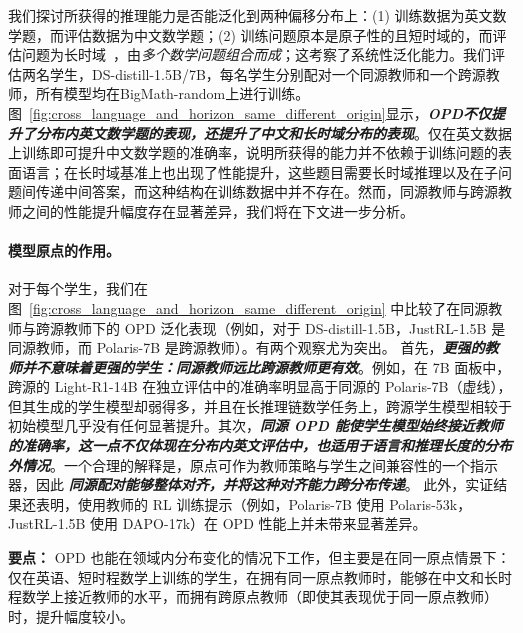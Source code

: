 我们探讨所获得的推理能力是否能泛化到两种偏移分布上：(1) 训练数据为英文数学题，而评估数据为中文数学题；(2) 训练问题原本是原子性的且短时域的，而评估问题为长时域~\citep{dziri2023faith, shojaee2025the,lu2025r}，由\emph{多个数学问题组合而成}；这考察了系统性泛化能力。我们评估两名学生，DS-distill-1.5B/7B，每名学生分别配对一个同源教师和一个跨源教师，所有模型均在BigMath-random上进行训练。图~\ref{fig:cross_language_and_horizon_same_different_origin}显示，\emph{\textbf{OPD不仅提升了分布内英文数学题的表现，还提升了中文和长时域分布的表现}}。仅在英文数据上训练即可提升中文数学题的准确率，说明所获得的能力并不依赖于训练问题的表面语言；在长时域基准上也出现了性能提升，这些题目需要长时域推理以及在子问题间传递中间答案，而这种结构在训练数据中并不存在。然而，同源教师与跨源教师之间的性能提升幅度存在显著差异，我们将在下文进一步分析。

\paragraph{模型原点的作用。}
\label{subsec:origin_indomain}
对于每个学生，我们在图~\ref{fig:cross_language_and_horizon_same_different_origin} 中比较了在同源教师与跨源教师下的 OPD 泛化表现（例如，对于 DS-distill-1.5B，JustRL-1.5B 是同源教师，而 Polaris-7B 是跨源教师）。有两个观察尤为突出。  
首先，\emph{\textbf{更强的教师并不意味着更强的学生：同源教师远比跨源教师更有效}}。例如，在 7B 面板中，跨源的 Light-R1-14B 在独立评估中的准确率明显高于同源的 Polaris-7B（虚线），但其生成的学生模型却弱得多，并且在长推理链数学任务上，跨源学生模型相较于初始模型几乎没有任何显著提升。其次，\emph{\textbf{同源 OPD 能使学生模型始终接近教师的准确率，这一点不仅体现在分布内英文评估中，也适用于语言和推理长度的分布外情况}}。一个合理的解释是，原点可作为教师策略与学生之间兼容性的一个指示器，因此 \emph{\textbf{同源配对能够整体对齐，并将这种对齐能力跨分布传递}}。  
此外，实证结果还表明，使用教师的 RL 训练提示（例如，Polaris-7B 使用 Polaris-53k，JustRL-1.5B 使用 DAPO-17k）在 OPD 性能上并未带来显著差异。

\begin{insightbox}
\textbf{要点：}
OPD 也能在领域内分布变化的情况下工作，但主要是在同一原点情景下：仅在英语、短时程数学上训练的学生，在拥有同一原点教师时，能够在中文和长时程数学上接近教师的水平，而拥有跨原点教师（即使其表现优于同一原点教师）时，提升幅度较小。
\end{insightbox}
